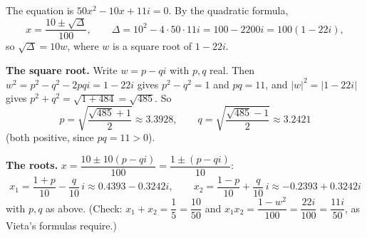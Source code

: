 The equation is $50x^2-10x+11i=0$. By the quadratic formula,
\[x=\dfrac{10\pm\sqrt{\Delta}}{100},\qquad\Delta=10^2-4\cdot50\cdot11i=100-2200i=100(1-22i),\]
so $\sqrt\Delta=10w$, where $w$ is a square root of $1-22i$.

\textbf{The square root.} Write $w=p-qi$ with $p,q$ real. Then $w^2=p^2-q^2-2pqi=1-22i$ gives $p^2-q^2=1$ and $pq=11$, and $|w|^2=|1-22i|$ gives $p^2+q^2=\sqrt{1+484}=\sqrt{485}$. So
\[p=\sqrt{\dfrac{\sqrt{485}+1}{2}}\approx3.3928,\qquad q=\sqrt{\dfrac{\sqrt{485}-1}{2}}\approx3.2421\]
(both positive, since $pq=11>0$).

\textbf{The roots.} $x=\dfrac{10\pm10(p-qi)}{100}=\dfrac{1\pm(p-qi)}{10}$:
\[\boxed{x_1=\dfrac{1+p}{10}-\dfrac{q}{10}\,i\approx0.4393-0.3242i,\qquad x_2=\dfrac{1-p}{10}+\dfrac{q}{10}\,i\approx-0.2393+0.3242i}\]
with $p,q$ as above. (Check: $x_1+x_2=\dfrac15=\dfrac{10}{50}$ and $x_1x_2=\dfrac{1-w^2}{100}=\dfrac{22i}{100}=\dfrac{11i}{50}$, as Vieta's formulas require.)
